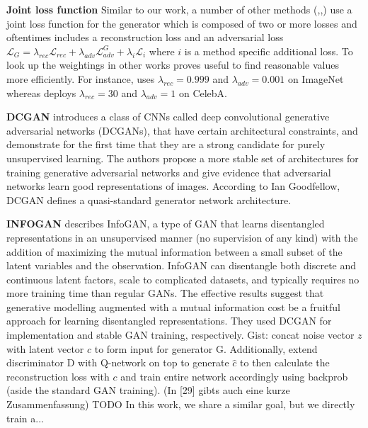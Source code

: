 \documentclass[12pt,a4paper]{article}
\begin{document}
\par \textbf{Joint loss function}
Similar to our work, a number of other methods (\cite{1511.05440},\cite{DisentFacOfVarByMixTh},\cite{1604.07379}) use a joint loss function for the generator which is composed of two or more losses and oftentimes includes a reconstruction loss and an adversarial loss $\mathcal{L}_G = \lambda_{rec}\mathcal{L}_{rec} + \lambda_{adv}\mathcal{L}^G_{adv} + \lambda_{i}\mathcal{L}_{i}$ where $i$ is a method specific additional loss. To look up the weightings in other works proves useful to find reasonable values more efficiently. For instance, \cite{1604.07379} uses $\lambda_{rec} = 0.999$ and $\lambda_{adv} = 0.001$ on ImageNet whereas \cite{DisentFacOfVarByMixTh} deploys $\lambda_{rec} = 30$ and $\lambda_{adv} = 1$ on CelebA.

\par \textbf{DCGAN} \cite{DCGAN} introduces a class of CNNs called deep convolutional generative adversarial networks (DCGANs), that have certain architectural constraints, and demonstrate for the first time that they are a strong candidate for purely unsupervised learning. The authors propose a more stable set of architectures for training generative adversarial networks and give evidence that adversarial networks learn good representations of images. According to Ian Goodfellow, DCGAN defines a quasi-standard generator network architecture. 

\par\textbf{INFOGAN} \cite{InfoGAN} describes InfoGAN, a type of GAN that learns disentangled representations in an unsupervised manner (no supervision of any kind) with the addition of maximizing the mutual information between a small subset of the latent variables and the observation. InfoGAN can disentangle both discrete and continuous latent factors, scale to complicated datasets, and typically requires no more training time than regular GANs.  The effective results suggest that generative modelling augmented with a mutual information cost be a fruitful approach for learning disentangled representations. They used DCGAN for implementation and stable GAN training, respectively. Gist: concat noise vector $z$ with latent vector $c$ to form input for generator G. Additionally, extend discriminator D with Q-network on top to generate $\hat{c}$ to then calculate the reconstruction loss with $c$ and train entire network accordingly using backprob (aside the standard GAN training). (In [29] gibts auch eine kurze Zusammenfassung) TODO In this work, we share a similar goal, but we
directly train a...
\end{document}
